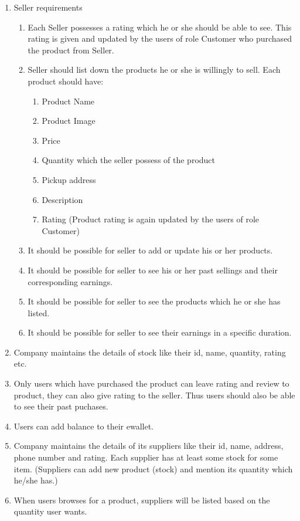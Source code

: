 \documentclass[a4paper,12pt]{article}
\begin{document}
\begin{enumerate}
  \item Seller requirements
  \begin{enumerate}
    \item Each Seller possesses a rating which he or she should be able to see. This rating is given and updated by the users of role Customer who purchased the product from Seller.
    \item Seller should list down the products he or she is willingly to sell. Each product should have:
    \begin{enumerate}
      \item Product Name
      \item Product Image
      \item Price 
      \item Quantity which the seller possess of the product
      \item Pickup address
      \item Description
      \item Rating (Product rating is again updated by the users of role Customer)
    \end{enumerate}
    \item It should be possible for seller to add or update his or her products.
    \item It should be possible for seller to see his or her past sellings and their corresponding earnings.
    \item It should be possible for seller to see the products which he or she has listed. 
    \item It should be possible for seller to see their earnings in a specific duration. 
  \end{enumerate}
  \item Company maintains the details of stock like their id, name, quantity, rating etc.


  \item Only users which have purchased the product can leave rating and review to product, they can also give rating to the seller. Thus users should also be able to see their past puchases.

  \item Users can add balance to their ewallet.

  \item Company maintains the details of its suppliers like their id, name, address, phone number and rating. Each supplier has at least some stock for some item. (Suppliers can add new product (stock) and mention its quantity which he/she has.)

  \item When users browses for a product, suppliers will be listed based on the quantity user wants.
\end{enumerate}
\end{document}
